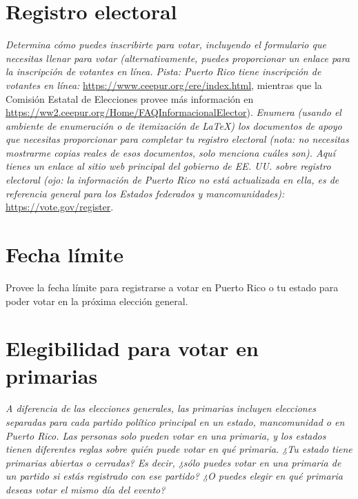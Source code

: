 \documentclass[11pt]{article} %
\begin{document}
\section{Registro electoral}

\textit{Determina cómo puedes inscribirte para votar, incluyendo el formulario que necesitas llenar para votar (alternativamente, puedes proporcionar un enlace para la inscripción de votantes en línea. Pista: Puerto Rico tiene inscripción de votantes en línea:} \url{https://www.ceepur.org/ere/index.html}, mientras que la Comisión Estatal de Elecciones provee más información en \url{https://ww2.ceepur.org/Home/FAQInformacionalElector}). \textit{Enumera (usando el ambiente de enumeración o de itemización de \LaTeX) los documentos de apoyo que necesitas proporcionar para completar tu registro electoral (nota: no necesitas mostrarme copias reales de esos documentos, solo menciona cuáles son). Aquí tienes un enlace al sitio web principal del gobierno de EE. UU. sobre registro electoral (ojo: la información de Puerto Rico no está actualizada en ella, es de referencia general para los Estados federados y mancomunidades):} \url{https://vote.gov/register}.  

\section{Fecha límite}

Provee la fecha límite para registrarse a votar en Puerto Rico o tu estado para poder votar en la próxima elección general.

\section{Elegibilidad para votar en primarias}

\textit{A diferencia de las elecciones generales, las primarias incluyen elecciones separadas para cada partido político principal en un estado, mancomunidad o en Puerto Rico. Las personas solo pueden votar en una primaria, y los estados tienen diferentes reglas sobre quién puede votar en qué primaria. ¿Tu estado tiene primarias abiertas o cerradas? Es decir, ¿sólo puedes votar en una primaria de un partido si estás registrado con ese partido? ¿O puedes elegir en qué primaria deseas votar el mismo día del evento?}
\end{document}
